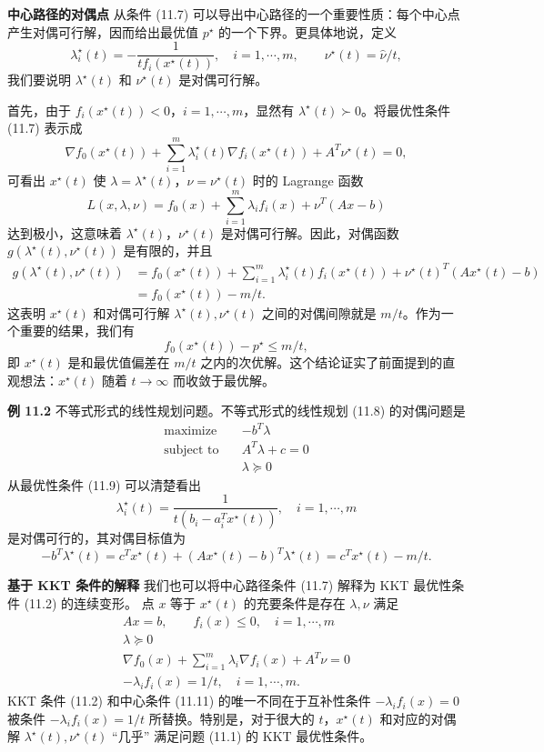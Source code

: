\documentclass[UTF8,12pt,a4paper,fontset=fandol]{ctexart}
\begin{document}
\noindent\textbf{中心路径的对偶点}\quad
从条件 (11.7) 可以导出中心路径的一个重要性质：每个中心点产生对偶可行解，因而给出最优值 $p^\star$ 的一个下界。更具体地说，定义
\begin{equation}
\lambda_i^\star(t)=-\frac{1}{tf_i(x^\star(t))},\quad i=1,\cdots,m,\qquad \nu^\star(t)=\hat{\nu}/t,
\tag{11.10}
\end{equation}
我们要说明 $\lambda^\star(t)$ 和 $\nu^\star(t)$ 是对偶可行解。

首先，由于 $f_i(x^\star(t))<0$，$i=1,\cdots,m$，显然有 $\lambda^\star(t)\succ 0$。将最优性条件 (11.7) 表示成
\[
\nabla f_0(x^\star(t))+\sum_{i=1}^m\lambda_i^\star(t)\nabla f_i(x^\star(t))+A^T\nu^\star(t)=0,
\]
可看出 $x^\star(t)$ 使 $\lambda=\lambda^\star(t)$，$\nu=\nu^\star(t)$ 时的 Lagrange 函数
\[
L(x,\lambda,\nu)=f_0(x)+\sum_{i=1}^m\lambda_if_i(x)+\nu^T(Ax-b)
\]
达到极小，这意味着 $\lambda^\star(t)$，$\nu^\star(t)$ 是对偶可行解。因此，对偶函数 $g(\lambda^\star(t),\nu^\star(t))$ 是有限的，并且
\[
\begin{aligned}
g(\lambda^\star(t),\nu^\star(t))
&=f_0(x^\star(t))+\sum_{i=1}^m\lambda_i^\star(t)f_i(x^\star(t))+\nu^\star(t)^T(Ax^\star(t)-b)\\
&=f_0(x^\star(t))-m/t.
\end{aligned}
\]
这表明 $x^\star(t)$ 和对偶可行解 $\lambda^\star(t),\nu^\star(t)$ 之间的对偶间隙就是 $m/t$。作为一个重要的结果，我们有
\[
f_0(x^\star(t))-p^\star\leq m/t,
\]
即 $x^\star(t)$ 是和最优值偏差在 $m/t$ 之内的次优解。这个结论证实了前面提到的直观想法：$x^\star(t)$ 随着 $t\to\infty$ 而收敛于最优解。

\noindent\textbf{例 11.2}\quad
不等式形式的线性规划问题。不等式形式的线性规划 (11.8) 的对偶问题是
\[
\begin{aligned}
\text{maximize}\quad & -b^T\lambda\\
\text{subject to}\quad & A^T\lambda+c=0\\
& \lambda\succeq 0
\end{aligned}
\]
从最优性条件 (11.9) 可以清楚看出
\[
\lambda_i^\star(t)=\frac{1}{t(b_i-a_i^Tx^\star(t))},\quad i=1,\cdots,m
\]
是对偶可行的，其对偶目标值为
\[
-b^T\lambda^\star(t)=c^Tx^\star(t)+(Ax^\star(t)-b)^T\lambda^\star(t)=c^Tx^\star(t)-m/t.
\]

\noindent\textbf{基于 KKT 条件的解释}\quad
我们也可以将中心路径条件 (11.7) 解释为 KKT 最优性条件 (11.2) 的连续变形。
点 $x$ 等于 $x^\star(t)$ 的充要条件是存在 $\lambda,\nu$ 满足
\begin{equation}
\begin{gathered}
Ax=b,\qquad f_i(x)\leq 0,\quad i=1,\cdots,m\\
\lambda\succeq 0\\
\nabla f_0(x)+\sum_{i=1}^m\lambda_i\nabla f_i(x)+A^T\nu=0\\
-\lambda_i f_i(x)=1/t,\quad i=1,\cdots,m.
\end{gathered}
\tag{11.11}
\end{equation}
KKT 条件 (11.2) 和中心条件 (11.11) 的唯一不同在于互补性条件 $-\lambda_i f_i(x)=0$ 被条件 $-\lambda_i f_i(x)=1/t$ 所替换。特别是，对于很大的 $t$，$x^\star(t)$ 和对应的对偶解 $\lambda^\star(t),\nu^\star(t)$ ``几乎'' 满足问题 (11.1) 的 KKT 最优性条件。
\end{document}
